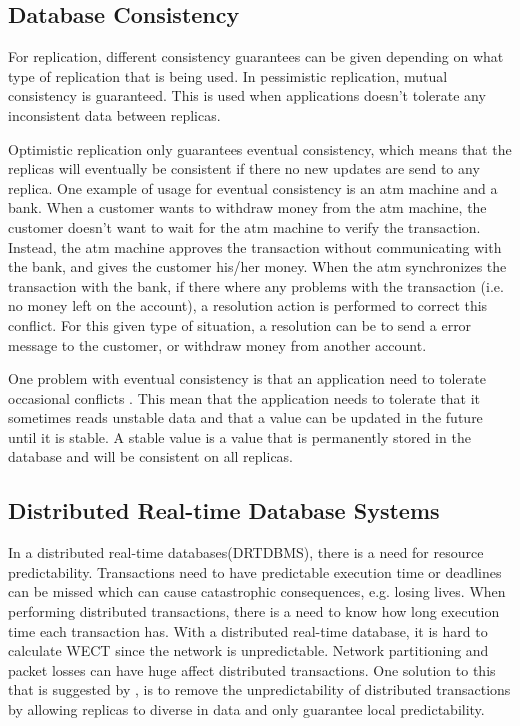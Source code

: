\subsection{Database Consistency} %
\label{sub:consistency}

For replication, different consistency guarantees can be given depending on what type of replication that is being used. In pessimistic replication, mutual consistency is guaranteed. This is used when applications doesn't tolerate any inconsistent data between replicas. 

Optimistic replication only guarantees eventual consistency, which means that the replicas will eventually be consistent if there no new updates are send to any replica. One example of usage for eventual consistency is an atm machine and a bank. When a customer wants to withdraw money from the atm machine, the customer doesn't want to wait for the atm machine to verify the transaction. Instead, the atm machine approves the transaction without communicating with the bank, and gives the customer his/her money. When the atm synchronizes the transaction with the bank, if there where any problems with the transaction (i.e. no money left on the account), a resolution action is performed to correct this conflict. For this given type of situation, a resolution can be to send a error message to the customer, or withdraw money from another account. 

One problem with eventual consistency is that an application need to tolerate occasional conflicts \cite[]{saito2005}. This mean that the application needs to tolerate that it sometimes reads unstable data and that a value can be updated in the future until it is stable. A stable value is a value that is permanently stored in the database and will be consistent on all replicas.


\subsection{Distributed Real-time Database Systems} %
\label{sub:subsection_name}

In a distributed real-time databases(DRTDBMS), there is a need for resource predictability. Transactions need to have predictable execution time or deadlines can be missed which can cause catastrophic consequences, e.g. losing lives. When performing distributed transactions, there is a need to know how long execution time each transaction has. With a distributed real-time database, it is hard to calculate WECT since the network is unpredictable. Network partitioning and packet losses can have huge affect distributed transactions. One solution to this that is suggested by \cite{deeds}, is to remove the unpredictability of distributed transactions by allowing replicas to diverse in data and only guarantee local predictability.  

